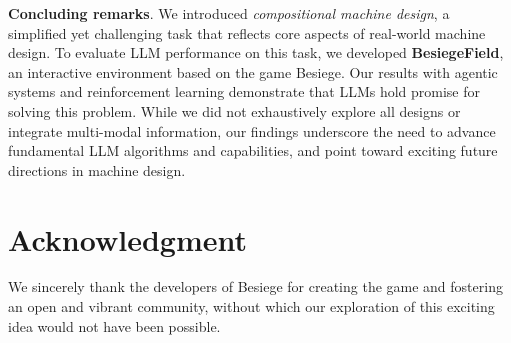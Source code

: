 \documentclass{article} %
\newcommand{\envname}{\textbf{BesiegeField}\xspace}
\theoremstyle{plain}
\theoremstyle{definition}
\begin{document}
\textbf{Concluding remarks}. We introduced \textit{compositional machine design}, a simplified yet challenging task that reflects core aspects of real-world machine design. To evaluate LLM performance on this task, we developed \envname, an interactive environment based on the game Besiege. Our results with agentic systems and reinforcement learning demonstrate that LLMs hold promise for solving this problem. While we did not exhaustively explore all designs or integrate multi-modal information, our findings underscore the need to advance fundamental LLM algorithms and capabilities, and point toward exciting future directions in machine design.





    
    
    
    


\section*{Acknowledgment}

We sincerely thank the developers of Besiege for creating the game and fostering an open and vibrant community, without which our exploration of this exciting idea would not have been possible.




\end{document}

